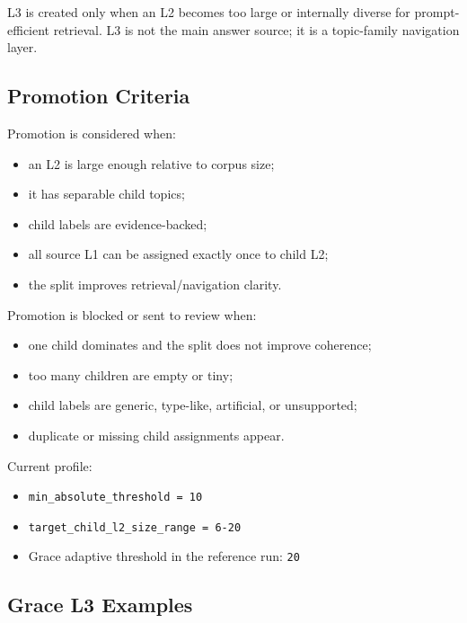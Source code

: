 \documentclass[11pt,a4paper]{article}
\newcommand{\code}[1]{{\footnotesize\texttt{#1}}}
\begin{document}
L3 is created only when an L2 becomes too large or internally diverse for prompt-efficient retrieval. L3 is not the main answer source; it is a topic-family navigation layer.

\subsection{Promotion Criteria}

Promotion is considered when:

\begin{itemize}
  \item an L2 is large enough relative to corpus size;
  \item it has separable child topics;
  \item child labels are evidence-backed;
  \item all source L1 can be assigned exactly once to child L2;
  \item the split improves retrieval/navigation clarity.
\end{itemize}

Promotion is blocked or sent to review when:

\begin{itemize}
  \item one child dominates and the split does not improve coherence;
  \item too many children are empty or tiny;
  \item child labels are generic, type-like, artificial, or unsupported;
  \item duplicate or missing child assignments appear.
\end{itemize}

Current profile:

\begin{itemize}
  \item \code{min\_absolute\_threshold = 10}
  \item \code{target\_child\_l2\_size\_range = 6-20}
  \item Grace adaptive threshold in the reference run: \code{20}
\end{itemize}

\subsection{Grace L3 Examples}
\end{document}
